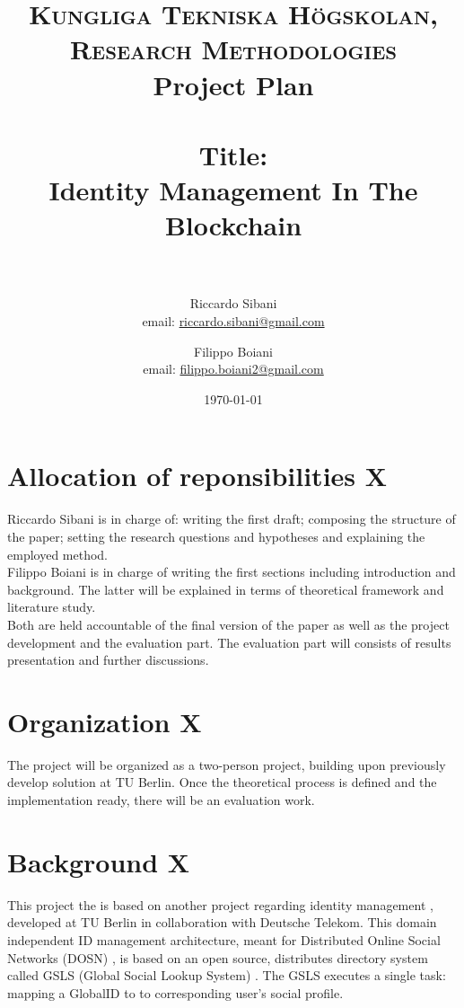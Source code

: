 \documentclass[paper=a4, fontsize=11pt]{scrartcl} %
\title{
\normalfont \normalsize
\textsc{Kungliga Tekniska Högskolan, Research Methodologies} \\ [10pt] %
Project Plan \\ [16pt]
\horrule{0.5pt} \\[0.5pt] %
\huge Title:\\Identity Management In The Blockchain \\ %
\vspace{5mm}
\horrule{1pt} \\[0.5cm] %
}
\author{Riccardo Sibani \\ email: \href{mailto:riccardo.sibani@gmail.com}{riccardo.sibani@gmail.com}
   \and Filippo Boiani \\ email: \href{mailto:filippo.boiani2@gmail.com}{filippo.boiani2@gmail.com} } %
\date{\normalsize\today} %
\numberwithin{equation}{section} %
\numberwithin{figure}{section} %
\numberwithin{table}{section} %
\begin{document}
\maketitle %


\section{Allocation of reponsibilities X}
Riccardo Sibani is in charge of: writing the first draft; composing the structure of the paper; setting the research questions and hypotheses and explaining the employed method.
\\

Filippo Boiani is in charge of writing the first sections including introduction and background. The latter will be explained in terms of theoretical framework and literature study. 
\\

Both are held accountable of the final version of the paper as well as the project development and the evaluation part. The evaluation part will consists of results presentation and further discussions. 

\section{Organization X}
The project will be organized as a two-person project, building upon previously develop solution at TU Berlin. Once the theoretical process is defined and the implementation ready, there will be an evaluation work.

\section{Background X}
This project the is based on another project regarding identity management \cite{identityMgmt2003} \cite{gondor2016distributed}, developed at TU Berlin in collaboration with Deutsche Telekom. This domain independent ID management architecture, meant for Distributed Online Social Networks (DOSN) \cite{gondor2014sonic}, is based on an open source, distributes directory system called GSLS (Global Social Lookup System) \cite{gondor2016distributed}. The GSLS executes a single task: mapping a GlobalID to to corresponding user's social profile. 
\end{document}
